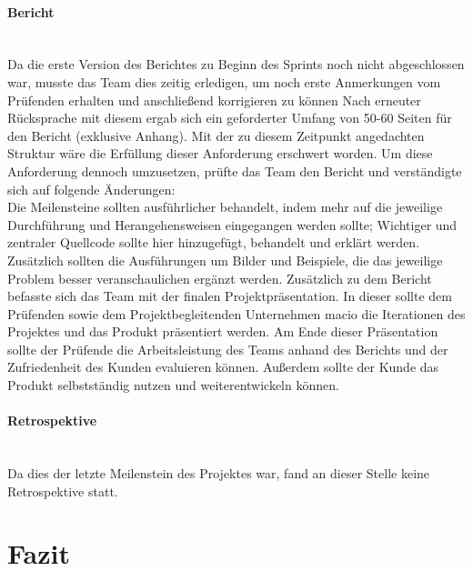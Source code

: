 \documentclass[10pt, a4paper]{article}
\begin{document}
\begin{onehalfspace}
\paragraph*{Bericht} $~$ \\
Da die erste Version des Berichtes zu Beginn des Sprints noch nicht abgeschlossen war, musste das Team dies zeitig erledigen, um noch erste Anmerkungen vom Prüfenden erhalten und anschließend korrigieren zu können
Nach erneuter Rücksprache mit diesem ergab sich ein geforderter Umfang von 50-60 Seiten für den Bericht (exklusive Anhang).
Mit der zu diesem Zeitpunkt angedachten Struktur wäre die Erfüllung dieser Anforderung erschwert worden.
Um diese Anforderung dennoch umzusetzen, prüfte das Team den Bericht und verständigte sich auf  folgende Änderungen:\\
Die Meilensteine sollten ausführlicher behandelt, indem mehr auf die jeweilige Durchführung und Herangehensweisen eingegangen werden sollte;
Wichtiger und zentraler Quellcode sollte hier hinzugefügt, behandelt und erklärt werden.
Zusätzlich sollten die Ausführungen um Bilder und Beispiele, die das jeweilige Problem besser veranschaulichen ergänzt werden.
Zusätzlich zu dem Bericht befasste sich das Team mit der finalen Projektpräsentation.
In dieser sollte dem Prüfenden sowie dem Projektbegleitenden Unternehmen macio die Iterationen des Projektes und das Produkt präsentiert werden.
Am Ende dieser Präsentation sollte der Prüfende die Arbeitsleistung des Teams anhand des Berichts und der Zufriedenheit des Kunden evaluieren können. Außerdem sollte der Kunde das Produkt selbstständig nutzen und weiterentwickeln können.

\paragraph*{Retrospektive} $~$ \\
Da dies der letzte Meilenstein des Projektes war, fand an dieser Stelle keine Retrospektive statt.

\section{Fazit}

\end{onehalfspace}
\end{document}
